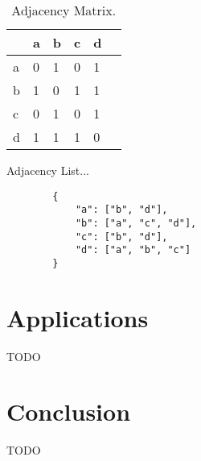 \documentclass[a4paper]{article}
\begin{document}
        
    \begin{table}[H]
        \centering
        \caption{\label{tab:adjacency-matrix}Adjacency Matrix.}
        \vspace*{10pt}
        \begin{tabular}{ l|l|l|l|l|l| } 
                & a & b & c & d \\
            \hline
            a   & 0 & 1 & 0 & 1 \\
            b   & 1 & 0 & 1 & 1 \\
            c   & 0 & 1 & 0 & 1 \\
            d   & 1 & 1 & 1 & 0 \\
            \hline
        \end{tabular}
    \end{table}



    Adjacency List...

    \begin{verbatim}
        { 
            "a": ["b", "d"],
            "b": ["a", "c", "d"],
            "c": ["b", "d"],
            "d": ["a", "b", "c"]
        }
    \end{verbatim}


    \section{Applications}
    TODO


    \section*{Conclusion}
    TODO

    
     
\end{document}
